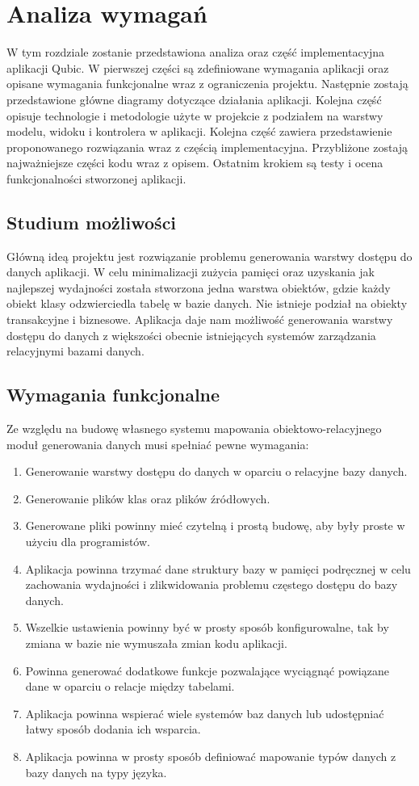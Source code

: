 \documentclass[12pt]{report}
\begin{document}
\section{Analiza wymagań}
	\indent W tym rozdziale zostanie przedstawiona analiza oraz część implementacyjna aplikacji Qubic. W pierwszej części są zdefiniowane wymagania aplikacji oraz opisane wymagania funkcjonalne wraz z ograniczenia projektu. Następnie zostają przedstawione główne diagramy dotyczące działania aplikacji. Kolejna część opisuje technologie i metodologie użyte w projekcie z podziałem na warstwy modelu, widoku i kontrolera w aplikacji. Kolejna część zawiera przedstawienie proponowanego rozwiązania wraz z częścią implementacyjna. Przybliżone zostają najważniejsze części kodu wraz z opisem. Ostatnim krokiem są testy i ocena funkcjonalności stworzonej aplikacji.
\subsection{Studium możliwości}
	\indent Główną ideą projektu jest rozwiązanie problemu generowania warstwy dostępu do danych aplikacji. W celu minimalizacji zużycia pamięci oraz uzyskania jak najlepszej wydajności została stworzona jedna warstwa obiektów, gdzie każdy obiekt klasy odzwierciedla tabelę w bazie danych. Nie istnieje podział na obiekty transakcyjne i biznesowe. Aplikacja daje nam możliwość generowania warstwy dostępu do danych z większości obecnie istniejących systemów zarządzania relacyjnymi bazami danych.
\subsection{Wymagania funkcjonalne}
	\indent Ze względu na budowę własnego systemu mapowania obiektowo-relacyjnego moduł generowania danych musi spełniać pewne wymagania:
	\begin{enumerate}
	\item{Generowanie warstwy dostępu do danych w oparciu o relacyjne bazy danych.}
	\item{Generowanie plików klas oraz plików źródłowych.}
	\item{Generowane pliki powinny mieć czytelną i prostą budowę, aby były proste w użyciu dla programistów.}
	\item{Aplikacja powinna trzymać dane struktury bazy w pamięci podręcznej w celu zachowania wydajności i zlikwidowania problemu częstego dostępu do bazy danych.}
	\item{Wszelkie ustawienia powinny być w prosty sposób konfigurowalne, tak by zmiana w bazie nie wymuszała zmian kodu aplikacji.}
	\item{Powinna generować dodatkowe funkcje pozwalające wyciągnąć powiązane dane w oparciu o relacje między tabelami.}
	\item{Aplikacja powinna wspierać wiele systemów baz danych lub udostępniać łatwy sposób dodania ich wsparcia.}
	\item{Aplikacja powinna w prosty sposób definiować mapowanie typów danych z bazy danych na typy języka.}
	\end{enumerate}
\end{document}

